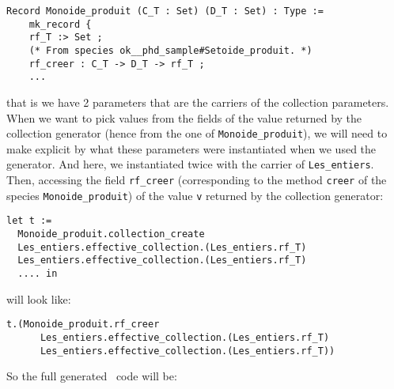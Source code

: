{\footnotesize
\begin{lstlisting}[language=MyCoq]
  Record Monoide_produit (C_T : Set) (D_T : Set) : Type :=
    mk_record {
    rf_T :> Set ;
    (* From species ok__phd_sample#Setoide_produit. *)
    rf_creer : C_T -> D_T -> rf_T ;
    ...
\end{lstlisting}
}
that is we have 2 parameters that are the carriers of the collection
parameters. When we want to pick values from the fields of the value
returned by the collection generator (hence from the one of
{\tt Monoide\_produit}), we will need to make explicit by what these
parameters were instantiated when we used the generator. And here, we
instantiated twice with the carrier of {\tt Les\_entiers}.
Then, accessing the field {\tt rf\_creer} (corresponding to the method
{\tt creer} of the species {\tt Monoide\_produit}) of the value
{\tt v} returned by the collection generator:

{\footnotesize
\begin{lstlisting}[language=MyCoq]
let t :=
  Monoide_produit.collection_create
  Les_entiers.effective_collection.(Les_entiers.rf_T)
  Les_entiers.effective_collection.(Les_entiers.rf_T)
  .... in
\end{lstlisting}
}
will look like:

{\footnotesize
\begin{lstlisting}[language=MyCoq]
 t.(Monoide_produit.rf_creer
      Les_entiers.effective_collection.(Les_entiers.rf_T)
      Les_entiers.effective_collection.(Les_entiers.rf_T))
\end{lstlisting}
}

So the full generated \coq\ code will be:

